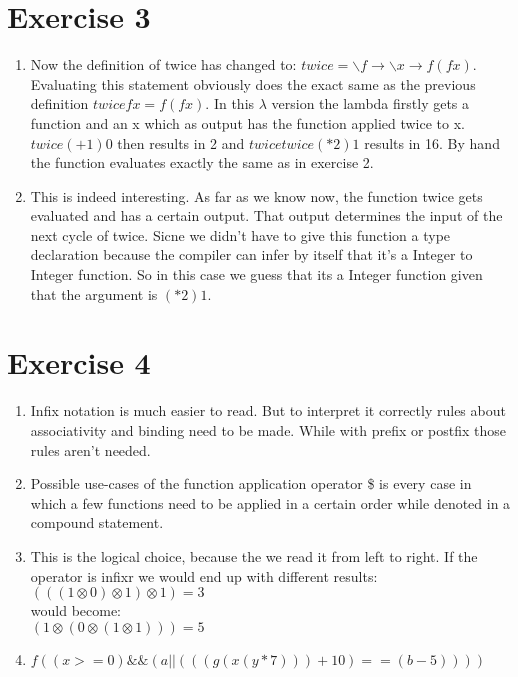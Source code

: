 \documentclass{article}
\begin{document}
\section*{Exercise 3}
\begin{enumerate}
  \item
  Now the definition of twice has changed to: $twice = \backslash f \rightarrow \backslash x \rightarrow f (f x)$.
  Evaluating this statement obviously does the exact same as the previous definition $twice f x = f(f x)$. In this $\lambda$ version the lambda firstly gets a function and an x which as output has the function applied twice to x.
  \newline
  $twice (+1) 0$ then results in 2 and $twice twice (*2) 1$ results in 16. By hand the function evaluates exactly the same as in exercise 2.
  \item This is indeed interesting. As far as we know now, the function twice gets evaluated and has a certain output. That output determines the input of the next cycle of twice. Sicne we didn't have to give this function a type declaration because the compiler can infer by itself that it's a Integer to Integer function. So in this case we guess that its a Integer function given that the argument is $(*2) 1$.
\end{enumerate}

\section*{Exercise 4}
\begin{enumerate}
    \item Infix notation is much easier to read. But to interpret it correctly rules about associativity and binding need to be made. While with prefix or postfix those rules aren't needed.
    \item Possible use-cases of the function application operator \$ is every case in which a few functions need to be applied in a certain order while denoted in a compound statement.
    \item This is the logical choice, because the we read it from left to right. If the operator is infixr we would end up with different results:\\
    $(((1 \otimes 0) \otimes 1) \otimes 1) = 3$\\
    would become:\\
    $(1 \otimes (0 \otimes (1 \otimes 1))) = 5$
    \item $f ((x >= 0) \&\& (a || (((g (x (y * 7))) + 10) == (b-5))))$
\end{enumerate}
\end{document}
